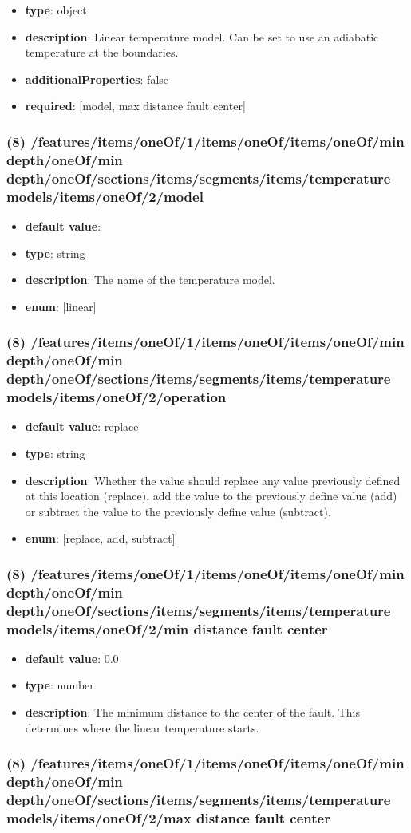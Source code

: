 \begin{itemize}[leftmargin=7em]\item {\bf type}: object
\item {\bf description}: Linear temperature model. Can be set to use an adiabatic temperature at the boundaries.
\item {\bf additionalProperties}: false
\item {\bf required}: [model, max distance fault center]\end{itemize}
\subsubsection{(8) /features/items/oneOf/1/items/oneOf/items/oneOf/min depth/oneOf/min depth/oneOf/sections/items/segments/items/temperature models/items/oneOf/2/model}
\begin{itemize}[leftmargin=8em]\item {\bf default value}: 
\item {\bf type}: string
\item {\bf description}: The name of the temperature model.
\item {\bf enum}: [linear]\end{itemize}\subsubsection{(8) /features/items/oneOf/1/items/oneOf/items/oneOf/min depth/oneOf/min depth/oneOf/sections/items/segments/items/temperature models/items/oneOf/2/operation}
\begin{itemize}[leftmargin=8em]\item {\bf default value}: replace
\item {\bf type}: string
\item {\bf description}: Whether the value should replace any value previously defined at this location (replace), add the value to the previously define value (add) or subtract the value to the previously define value (subtract).
\item {\bf enum}: [replace, add, subtract]\end{itemize}\subsubsection{(8) /features/items/oneOf/1/items/oneOf/items/oneOf/min depth/oneOf/min depth/oneOf/sections/items/segments/items/temperature models/items/oneOf/2/min distance fault center}
\begin{itemize}[leftmargin=8em]\item {\bf default value}: 0.0
\item {\bf type}: number
\item {\bf description}: The minimum distance to the center of the fault. This determines where the linear temperature starts.
\end{itemize}\subsubsection{(8) /features/items/oneOf/1/items/oneOf/items/oneOf/min depth/oneOf/min depth/oneOf/sections/items/segments/items/temperature models/items/oneOf/2/max distance fault center}
